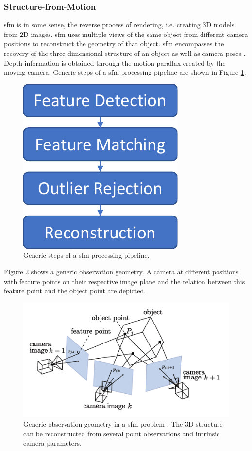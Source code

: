 \subsubsection{Structure-from-Motion}
\Gls{sfm} is in some sense, the reverse process of rendering, i.e. creating 3D models from 2D images. \gls{sfm} uses multiple views of the same object from different camera positions to reconstruct the geometry of that object. \Gls{sfm} encompasses the recovery of the three-dimensional structure of an object as well as camera poses \cite{szeliski2010computer}. Depth information is obtained through the motion parallax created by the moving camera. Generic steps of a \gls{sfm} processing pipeline are shown in Figure \ref{fig:sfm_steps}.

\begin{figure}[htb]
    \centering
    \includegraphics[width=.25\textwidth]{doc/thesis/0_figures/sfm/SfM.pdf}
    \caption{Generic steps of a \gls{sfm} processing pipeline.}
    \label{fig:sfm_steps}
\end{figure}

Figure \ref{fig:sfm_geometry} shows a generic observation geometry. A camera at different positions with feature points on their respective image plane and the relation between this feature point and the object point are depicted. 

\begin{figure}[htb]
    \centering
    \includegraphics[width=\textwidth]{doc/thesis/0_figures/sfm/sfm_geometry.png}
    \caption{Generic observation geometry in a \gls{sfm} problem \cite{andrews2019asteroid}. The 3D structure can be reconstructed from several point observations and intrinsic camera parameters.}
    \label{fig:sfm_geometry}
\end{figure}


